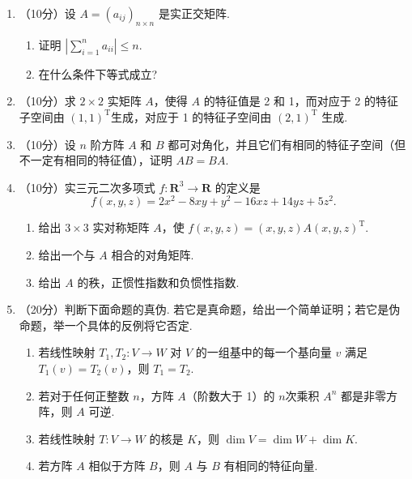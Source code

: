 \begin{enumerate}
    \item （10分）设 $A=(a_{ij})_{n\times n}$ 是实正交矩阵.
    \begin{enumerate}
        \item 证明 $\left\lvert\sum\limits_{i=1}^n{a_{ii}}\right\rvert \leqslant n$.

        \item 在什么条件下等式成立?
    \end{enumerate}

\item （10分）求 $2\times 2$ 实矩阵 $A$，使得 $A$ 的特征值是 2 和 1，而对应于 2 的特征子空间由 $(1, 1)^\mathrm{T}$生成，对应于 1 的特征子空间由 $(2, 1)^\mathrm{T}$ 生成.

    \item （10分）设 $n$ 阶方阵 $A$ 和 $B$ 都可对角化，并且它们有相同的特征子空间（但不一定有相同的特征值），证明 $AB=BA$.

    \item （10分）实三元二次多项式 $f\colon \mathbf{R}^3\to \mathbf{R}$ 的定义是
    \[f(x,y,z) = 2x^2-8xy+y^2-16xz+14yz+5z^2.\]
    \begin{enumerate}
        \item 给出 $3\times 3$ 实对称矩阵 $A$，使 $f(x,y,z) = (x,y,z)A(x,y,z)^{\mathrm{T}}$.

        \item 给出一个与 $A$ 相合的对角矩阵.

        \item 给出 $A$ 的秩，正惯性指数和负惯性指数.
    \end{enumerate}

\item （20分）判断下面命题的真伪. 若它是真命题，给出一个简单证明；若它是伪命题，举一个具体的反例将它否定.
    \begin{enumerate}
        \item 若线性映射 $T_1,T_2\colon V \to W$ 对 $V$ 的一组基中的每一个基向量 $v$ 满足 $T_1(v)=T_2(v)$，则 $T_1=T_2$.

        \item 若对于任何正整数 $n$，方阵 $A$（阶数大于 1）的 $n$次乘积 $A^n$ 都是非零方阵，则 $A$ 可逆.

        \item 若线性映射 $T\colon V\to W$ 的核是 $K$，则 $\dim V=\dim W+\dim K$.

        \item 若方阵 $A$ 相似于方阵 $B$，则 $A$ 与 $B$ 有相同的特征向量.
    \end{enumerate}
\end{enumerate}

\clearpage
